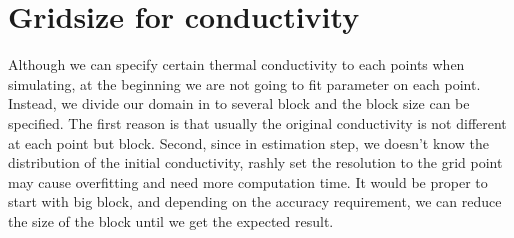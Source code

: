 \documentclass[10pt,a4paper]{report}
\begin{document}
\section{Gridsize for conductivity}
Although we can specify certain thermal conductivity to each points when simulating, at the beginning we are not going to fit parameter on each point. Instead, we divide our domain in to several block and the block size can be specified. The first reason is that usually the original conductivity is not different at each point but block. Second, since in estimation step, we doesn't know the distribution of the initial conductivity, rashly set the resolution to the grid point may cause overfitting and need more computation time. It would be proper to start with big block, and depending on the accuracy requirement, we can reduce the size of the block until we get the expected result.   








\end{document}
